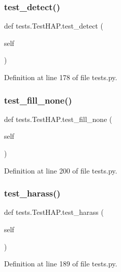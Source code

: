 \subsubsection{\texorpdfstring{test\+\_\+detect()}{test\_detect()}}
{\footnotesize\ttfamily def tests.\+Test\+H\+A\+P.\+test\+\_\+detect (\begin{DoxyParamCaption}\item[{}]{self }\end{DoxyParamCaption})}



Definition at line 178 of file tests.\+py.

\hypertarget{classtests_1_1_test_h_a_p_a63eccfd9627a2f70a099701fede2b722}{}\label{classtests_1_1_test_h_a_p_a63eccfd9627a2f70a099701fede2b722} 
\subsubsection{\texorpdfstring{test\+\_\+fill\+\_\+none()}{test\_fill\_none()}}
{\footnotesize\ttfamily def tests.\+Test\+H\+A\+P.\+test\+\_\+fill\+\_\+none (\begin{DoxyParamCaption}\item[{}]{self }\end{DoxyParamCaption})}



Definition at line 200 of file tests.\+py.

\hypertarget{classtests_1_1_test_h_a_p_aaec5eb9ebd0dd4b49acd8acd2b465a4f}{}\label{classtests_1_1_test_h_a_p_aaec5eb9ebd0dd4b49acd8acd2b465a4f} 
\subsubsection{\texorpdfstring{test\+\_\+harass()}{test\_harass()}}
{\footnotesize\ttfamily def tests.\+Test\+H\+A\+P.\+test\+\_\+harass (\begin{DoxyParamCaption}\item[{}]{self }\end{DoxyParamCaption})}



Definition at line 189 of file tests.\+py.

